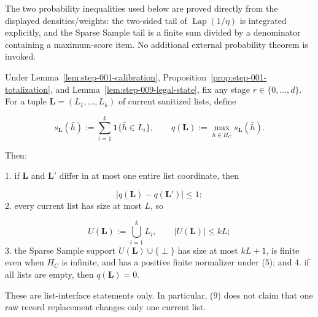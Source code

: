 The two probability inequalities used below are proved directly from the
displayed densities/weights: the two-sided tail of
\(\operatorname{Lap}(1/\eta)\) is integrated explicitly, and the Sparse
Sample tail is a finite sum divided by a denominator containing a
maximum-score item. No additional external probability theorem is invoked.



\begin{lemma}\label{lem:step-010-score-support}
Under Lemma~\ref{lem:step-001-calibration}, Proposition~\ref{prop:step-001-totalization}, and Lemma~\ref{lem:step-009-legal-state}, fix any stage
\(r\in\{0,\ldots,d\}\). For a tuple
\(\mathbf L=(L_1,\ldots,L_k)\) of current sanitized lists, define

\[
 s_{\mathbf L}(\bar h)
 :=\sum_{i=1}^k\mathbf1\{\bar h\in L_i\},
 \qquad
 q(\mathbf L):=\max_{\bar h\in H_C}s_{\mathbf L}(\bar h).
 \tag{8}
\]

Then:

1. if \(\mathbf L\) and \(\mathbf L'\) differ in at most one entire list
   coordinate, then

   \[
     |q(\mathbf L)-q(\mathbf L')|\leq1;
     \tag{9}
   \]
2. every current list has size at most \(L\), so

   \[
     U(\mathbf L):=\bigcup_{i=1}^kL_i,
     \qquad |U(\mathbf L)|\leq kL;
     \tag{10}
   \]
3. the Sparse Sample support
   \(U(\mathbf L)\cup\{\perp\}\) has size at most \(kL+1\), is finite even
   when \(H_C\) is infinite, and has a positive finite normalizer under
   (5); and
4. if all lists are empty, then \(q(\mathbf L)=0\).

These are list-interface statements only. In particular, (9) does not
claim that one raw record replacement changes only one current list.


\end{lemma}

